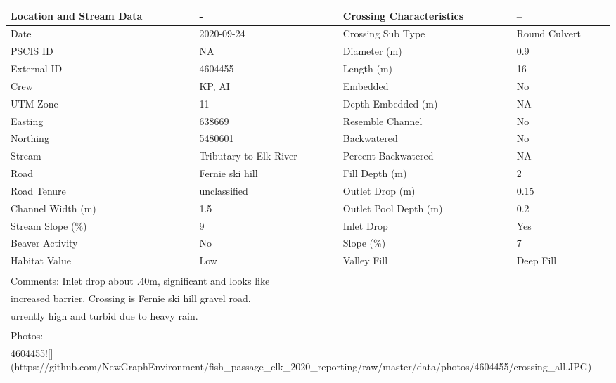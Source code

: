\documentclass[
]{book}
\begin{document}
\begin{tabular}{l|l|l|l}
\hline
Location and Stream Data & - & Crossing Characteristics & --\\
\hline
Date & 2020-09-24 & Crossing Sub Type & Round Culvert\\
\hline
PSCIS ID & NA & Diameter (m) & 0.9\\
\hline
External ID & 4604455 & Length (m) & 16\\
\hline
Crew & KP, AI & Embedded & No\\
\hline
UTM Zone & 11 & Depth Embedded (m) & NA\\
\hline
Easting & 638669 & Resemble Channel & No\\
\hline
Northing & 5480601 & Backwatered & No\\
\hline
Stream & Tributary to Elk River & Percent Backwatered & NA\\
\hline
Road & Fernie ski hill & Fill Depth (m) & 2\\
\hline
Road Tenure & unclassified & Outlet Drop (m) & 0.15\\
\hline
Channel Width (m) & 1.5 & Outlet Pool Depth (m) & 0.2\\
\hline
Stream Slope (\%) & 9 & Inlet Drop & Yes\\
\hline
Beaver Activity & No & Slope (\%) & 7\\
\hline
Habitat Value & Low & Valley Fill & Deep Fill\\
\hline
\multicolumn{4}{l}{\textsuperscript{} Comments: Inlet drop about .40m, significant and looks like}\\
\multicolumn{4}{l}{increased barrier. Crossing is Fernie ski hill gravel road.}\\
\multicolumn{4}{l}{urrently high and turbid due to heavy rain.}\\
\multicolumn{4}{l}{\textsuperscript{} Photos:}\\
\multicolumn{4}{l}{4604455![](https://github.com/NewGraphEnvironment/fish\_passage\_elk\_2020\_reporting/raw/master/data/photos/4604455/crossing\_all.JPG)}\\
\end{tabular}
\end{document}
